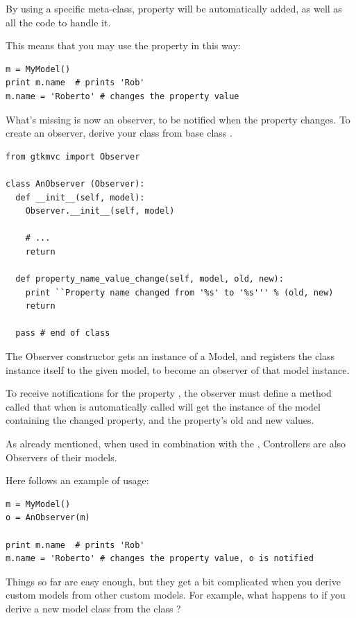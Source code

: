 By using a specific meta-class, property  will be
automatically added, as well as all the code to handle it.

This means that you may use the property in this way:
{ \codesize 
\begin{verbatim} 
m = MyModel()
print m.name  # prints 'Rob'
m.name = 'Roberto' # changes the property value
\end{verbatim}
}

What's missing is now an observer, to be notified when the property
changes. To create an observer, derive your class from base class
.

{ \codesize 
\begin{verbatim} 
from gtkmvc import Observer

class AnObserver (Observer):
  def __init__(self, model):
    Observer.__init__(self, model)

    # ...
    return

  def property_name_value_change(self, model, old, new):
    print ``Property name changed from '%s' to '%s''' % (old, new)
    return

  pass # end of class
\end{verbatim}
}

The Observer constructor gets an instance of a Model, and registers the
class instance itself to the given model, to become an observer of
that model instance.

To receive notifications for the property , the
observer must define a method called
 that when is automatically
called will get the instance of the model containing the changed
property, and the property's old and new values.

As already mentioned, when used in combination with the \mvc,
Controllers are also Observers of their models.

Here follows an example of usage:
{ \codesize 
\begin{verbatim} 
m = MyModel()
o = AnObserver(m)

print m.name  # prints 'Rob'
m.name = 'Roberto' # changes the property value, o is notified
\end{verbatim}
}

Things so far are easy enough, but they get a bit complicated when you
derive custom models from other custom models.  For example, what
happens to \OP if you derive a new model class from the class
?

